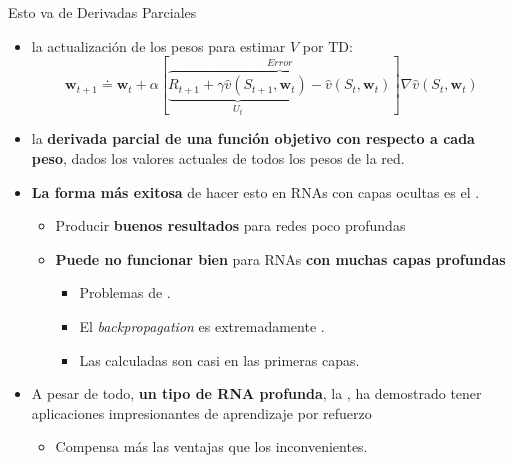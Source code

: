 \documentclass[10pt, envcountsect, handout, aspectratio=1610, hyperref={hypertexnames=true}]{beamer}
\begin{document}
\begin{frame}{Esto va de Derivadas Parciales}

\begin{itemize}
	\item {} la actualización de los pesos para estimar $V$ por TD:
	\begin{equation*}
		\mathbf{w}_{t+1} \doteq \mathbf{w}_t + \alpha \left[\overbrace{ \underbrace{R_{t+1} + \gamma  \hat{v}(S_{t+1}, \mathbf{w}_t)}_{U_t}  - \hat{v}(S_t, \mathbf{w}_t) }^{Error} \right] \nabla \hat{v}(S_t, \mathbf{w}_t)
	\end{equation*}
	
	
	\item {} la \textbf{derivada parcial de una función objetivo con respecto a cada peso}, dados los valores actuales de todos los pesos de la red.
	
	\item \textbf{La forma más exitosa} de hacer esto en RNAs con capas ocultas es el  .
	
		\begin{itemize}
			\item Producir \textbf{buenos resultados} para redes poco profundas
			\item \textbf{Puede no funcionar bien} para RNAs  \textbf{con muchas capas profundas}
				\begin{itemize}
					\item Problemas de .
					\item El \textit{backpropagation} es extremadamente .
					\item Las  calculadas son casi  en las primeras capas.
				\end{itemize}
		\end{itemize}

	\item A pesar de todo, \textbf{un tipo de RNA profunda}, la ,   ha demostrado tener aplicaciones impresionantes de aprendizaje por refuerzo
		\begin{itemize}
			\item Compensa más las ventajas que los inconvenientes.
		\end{itemize}
\end{itemize}

\end{frame}
\end{document}
